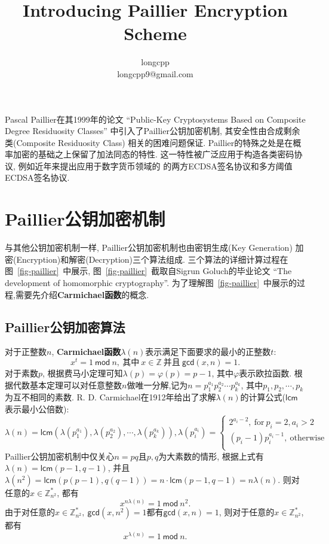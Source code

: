 \documentclass{article}
\newcommand{\Z}{\mathbb{Z}}
\begin{document}
\title{Introducing Paillier Encryption Scheme}
\author{longcpp \\ \small{longcpp9@gmail.com}}

\maketitle

Pascal Paillier在其1999年的论文
``Public-Key Cryptosystems Based on Composite Degree Residuosity Classes''
中引入了Paillier公钥加密机制, 其安全性由合成剩余类(Composite Residuosity Class)
相关的困难问题保证. Paillier的特殊之处是在概率加密的基础之上保留了加法同态的特性.
这一特性被广泛应用于构造各类密码协议, 例如近年来提出应用于数字货币领域的
的两方ECDSA签名协议和多方阈值ECDSA签名协议.

\section{Paillier公钥加密机制}

与其他公钥加密机制一样, Paillier公钥加密机制也由密钥生成(Key Generation)
加密(Encryption)和解密(Decryption)三个算法组成.
三个算法的详细计算过程在图~\ref{fig-paillier}~中展示, 
图~\ref{fig-paillier}~截取自Sigrun Goluch的毕业论文
``The development of homomorphic cryptography''. 
为了理解图~\ref{fig-paillier}~中展示的过程,需要先介绍\textbf{Carmichael函数}的概念.

\subsection{Paillier公钥加密算法}

对于正整数$n$, \textbf{Carmichael函数$\lambda(n)$}表示满足下面要求的最小的正整数$t$:
$$
x^t = 1 ~\textsf{mod}~ n, ~\text{其中}~ x \in \Z ~\text{并且}~ \textsf{gcd}(x, n) = 1.
$$
对于素数$p$, 根据费马小定理可知$\lambda(p) = \varphi(p) = p-1$, 其中$\varphi$表示欧拉函数.
根据代数基本定理可以对任意整数$n$做唯一分解,记为$n = p_1^{a_1}p_2^{a_2}\cdots p_k^{a_k}$,
其中$p_1, p_2, \cdots, p_k$为互不相同的素数. 
R. D. Carmichael在1912年给出了求解$\lambda(n)$的计算公式($\textsf{lcm}$表示最小公倍数): 
\begin{equation*}
\lambda(n) = \textsf{lcm}
\left(
\lambda\left(p_1^{a_1}\right), \lambda\left(p_2^{a_2}\right), \cdots, \lambda\left(p_k^{a_k}\right)
\right),
\lambda(p_i^{a_i}) = 
\left\{
\begin{array}{l}
2^{a_i - 2}, ~\text{for}~ p_i = 2, a_i > 2\\
(p_i - 1)p_i^{a_i - 1}, ~\text{otherwise}~\\
\end{array}
\right.
\end{equation*}
Paillier公钥加密机制中仅关心$n = pq$且$p, q$为大素数的情形, 
根据上式有$\lambda(n)=\textsf{lcm}(p-1, q-1)$, 并且
$\lambda(n^2) = \textsf{lcm}(p(p-1), q(q-1)) = n\cdot\textsf{lcm}(p-1, q-1) = n\lambda(n)$.
则对任意的$x\in \Z_{n^2}^*$, 都有$$x^{n\lambda(n)} = 1 ~\textsf{mod}~ n^2.$$
由于对任意的$x\in \Z_{n^2}^*, ~\textsf{gcd}(x, n^2) = 1$都有$\textsf{gcd}(x, n) = 1$, 
则对于任意的$x \in \Z_{n^2}^*$, 都有$$x^{\lambda(n)} = 1 ~\textsf{mod}~ n.$$
\end{document}
